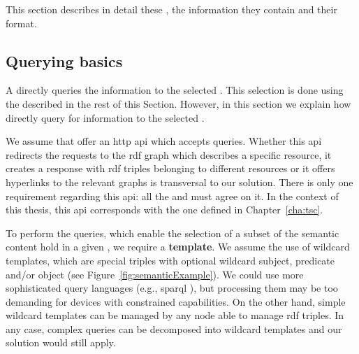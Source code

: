 This section describes in detail these \clues{}, the information they contain and their format.


\subsection{Querying basics} %


A \consumer{} directly queries the information to the selected \providers{}.
This selection is done using the \clues{} described in the rest of this Section.
However, in this section we explain how \consumers{} directly query for information to the selected \providers{}.

We assume that \providers{} offer an \ac{http} \ac{api} which accepts queries. %
Whether this \ac{api} redirects the requests to the \ac{rdf} graph which describes a specific resource,
it creates a response with \ac{rdf} triples belonging to different resources or
it offers hyperlinks to the relevant graphs is transversal to our solution.
There is only one requirement regarding this \ac{api}: all the \consumers{} and \providers{} must agree on it.
In the context of this thesis, this \ac{api} corresponds with the one defined in Chapter~\ref{cha:tsc}.

To perform the queries, which enable the selection of a subset of the semantic content hold in a given \Space{}, we require a \textbf{template}.
We assume the use of wildcard templates, which are special triples with optional wildcard subject, predicate and/or object (see Figure~\ref{fig:semanticExample}). %
We could use more sophisticated query languages (e.g., \ac{sparql} ),
but processing them may be too demanding for devices with constrained capabilities.
On the other hand, simple wildcard templates can be managed by any node able to manage \ac{rdf} triples.
In any case, complex queries can be decomposed into wildcard templates and our solution would still apply.





